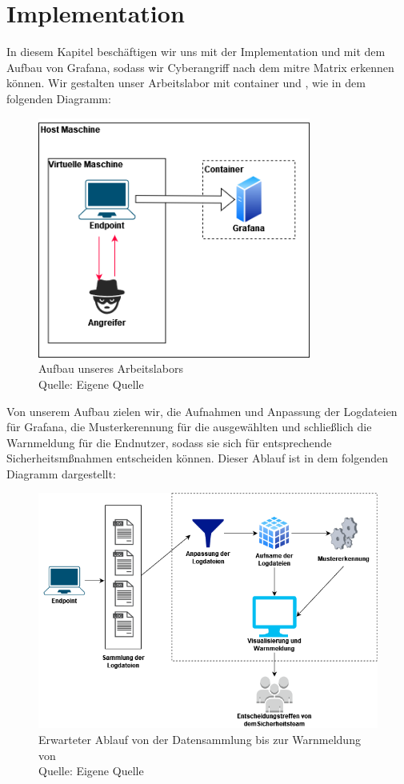 \section{Implementation}
In diesem Kapitel beschäftigen wir uns mit der Implementation und mit dem Aufbau von Grafana, sodass wir \gls{Cyberangriff} nach dem \gls{mitre} Matrix erkennen können. Wir gestalten unser Arbeitslabor mit \gls{container} und , wie in dem folgenden Diagramm:

\begin{figure}[H]
   \centering
   \includegraphics[width=0.8\textwidth]{assets/Arbeitslabor.drawio.png}
   \caption{Aufbau unseres Arbeitslabors \\Quelle: Eigene Quelle}
   \centering
\end{figure}

Von unserem Aufbau zielen wir, die Aufnahmen und Anpassung der Logdateien für Grafana, die Musterkerennung für die ausgewählten  und schließlich die Warnmeldung für die Endnutzer, sodass sie sich für entsprechende Sicherheitsmßnahmen entscheiden können. Dieser Ablauf ist in dem folgenden Diagramm dargestellt:

\begin{figure}[H]
   \centering
   \includegraphics[width=1\textwidth]{assets/Ablauf_grafana.drawio.png}
   \caption{Erwarteter Ablauf von der Datensammlung bis zur Warnmeldung von  \\Quelle: Eigene Quelle}
   \centering
\end{figure}

